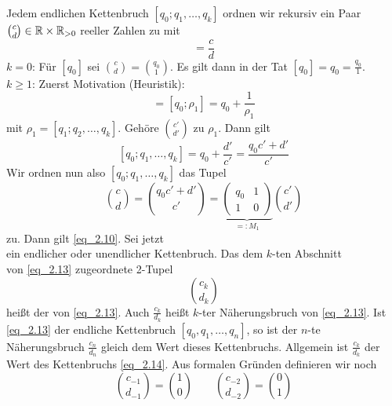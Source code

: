 \begin{defn}[Näherungsbruch] \label{def_2.5}
	Jedem endlichen Kettenbruch $[q_0;q_1,\dots,q_k]$ ordnen wir rekursiv ein Paar $\binom{c}{d} \in \mathbb{R} \times \mathbb{R}_{>0}$ reeller Zahlen zu mit
	\begin{equation}
		[q_0;q_1,\dots,q_k] = \frac{c}{d} \label{eq_2.10}
	\end{equation}
	$k = 0$: Für $[q_0]$ sei $\binom{c}{d} = \binom{q_0}{1}$. Es gilt dann in der Tat $[q_0] = q_0 = \frac{q_0}{1}$. \\
	$k \geq 1$: Zuerst Motivation (Heuristik):
	\begin{equation}
		[q_0;q_1,\dots,q_k] = [q_0;\rho_1] = q_0 + \frac{1}{\rho_1} \label{eq_2.11}
	\end{equation}
	mit $\rho_1 = [q_1;q_2,\dots,q_k]$. Gehöre $\binom{c'}{d'}$ zu $\rho_1$. Dann gilt
	\[ [q_0;q_1,\dots,q_k] = q_0 + \frac{d'}{c'} = \frac{q_0 c' + d'}{c'} \]
	Wir ordnen nun also $[q_0;q_1,\dots,q_k]$ das Tupel
	\begin{equation}
		\binom{c}{d} = \binom{q_0 c' + d'}{c'} = \underbrace{\begin{pmatrix}
		q_0 & 1 \\ 
		1 & 0
		\end{pmatrix}}_{=: M_1} \binom{c'}{d'} \label{eq_2.12}
	\end{equation}
	zu. Dann gilt \eqref{eq_2.10}. Sei jetzt
	\begin{equation}
		[q_0;q_1,\dots] \label{eq_2.13}
	\end{equation}
	ein endlicher oder unendlicher Kettenbruch. Das dem $k$-ten Abschnitt
	\begin{equation}
		[q_0;q_1,\dots,q_k] \label{eq_2.14}
	\end{equation}
	von \eqref{eq_2.13} zugeordnete 2-Tupel
	\begin{equation}
		\binom{c_k}{d_k} \label{eq_2.15}
	\end{equation}
	heißt der  von \eqref{eq_2.13}. Auch $\frac{c_k}{d_k}$ heißt $k$-ter Näherungsbruch von \eqref{eq_2.13}. Ist \eqref{eq_2.13} der endliche Kettenbruch $[q_0,q_1,\dots,q_n]$, so ist der $n$-te Näherungsbruch $\frac{c_n}{d_n}$ gleich dem Wert dieses Kettenbruchs. Allgemein ist $\frac{c_k}{d_k}$ der Wert des Kettenbruchs \eqref{eq_2.14}. Aus formalen Gründen definieren wir noch
	\begin{equation}
		\binom{c_{-1}}{d_{-1}} = \binom{1}{0} \qquad \binom{c_{-2}}{d_{-2}} = \binom{0}{1} \label{eq_2.16}
	\end{equation}
\end{defn}

